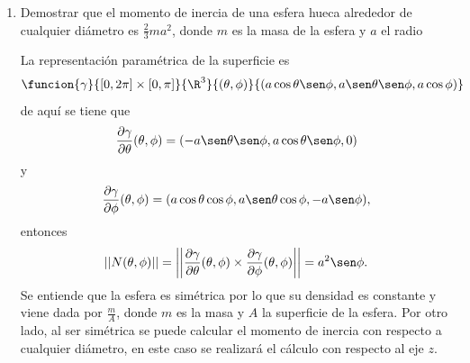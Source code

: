 \documentclass[a4,11pt]{aleph-examen}
\begin{document}
\begin{preguntas}
\begin{respuesta}
\begin{respuesta}
\begin{respuesta}
\begin{enumerate}
\begin{respuesta}
    De manera alternativa se puede parametrizar la superficie con
    \[
        \funcion{\beta}{[0,3]\times[0,2\pi]}{\R^3}{(r,t)}{\l(\dfrac{2}{3}r\cos t,\dfrac{2}{3}r\sen t,3-r \r),}
    \]
    de aquí
    \[
        \dfrac{\partial \beta}{\partial r}=\l(\dfrac{2}{3}\cos t,\dfrac{2}{3}\sen t,-1 \r) 
        \texty
        \dfrac{\partial \beta}{\partial t}=\l(-\dfrac{2}{3}r\sen t,\dfrac{2}{3}r\cos t,0 \r)
    \]
    entonces
    \[
        N(r,t)=\l(\dfrac{2}{3}r\cos t,\dfrac{2}{3}r\sen t,\dfrac{4}{9}r  \r)
        \texty
        \|N(r,t)\|=\dfrac{2\sqrt{13}}{9}r.
    \]
    Además
    \[
        \delta(\beta(r,t))=\dfrac{2}{3}r,
    \]
    finalmente se recomienda al estudiante verificar que
    \[
        M=\int_\beta \delta dS=\dfrac{4\sqrt{13}}{27} \int_0^{2\pi}\int_0^3 r^2drdt=\dfrac{8\sqrt{13}}{3}\pi.
    \]
\end{respuesta}

\item
    Demostrar que el momento de inercia de una esfera hueca alrededor de cualquier diámetro es $\frac{2}{3}ma^2$, donde $m$ es la masa de la esfera y $a$ el radio
    
\begin{respuesta}
    La representación paramétrica de la superficie es
    \[
        \funcion{\gamma}{[0,2\pi]\times [0,\pi]}{\R^3}{(\theta,\phi)}{(a\cos \theta \sen \phi,a\sen \theta \sen \phi,a \cos \phi)}
    \]
    de aquí se tiene que
    \[
        \frac{\partial \gamma}{\partial \theta}(\theta,\phi)=(-a\sen \theta \sen \phi,a\cos \theta \sen \phi,0)
    \]
    y
    \[
        \frac{\partial \gamma}{\partial \phi}(\theta,\phi)=(a\cos \theta \cos \phi,a\sen \theta \cos \phi,-a \sen \phi),
    \]
    entonces
    \[
        ||N(\theta,\phi)||=\left|\left| \frac{\partial \gamma}{\partial \theta}(\theta,\phi) \times \frac{\partial \gamma}{\partial \phi}(\theta,\phi) \right|\right|=a^2\sen \phi.
    \]
    Se entiende que la esfera es simétrica por lo que su densidad es constante y viene dada por $\frac{m}{A}$, donde $m$ es la masa y $A$ la superficie de la esfera. Por otro lado, al ser simétrica se puede calcular el momento de inercia con respecto a cualquier diámetro, en este caso se realizará el cálculo con respecto al eje $z$.
    

\end{respuesta}
\end{enumerate}
\end{respuesta}
\end{respuesta}
\end{respuesta}
\end{preguntas}
\end{document}
